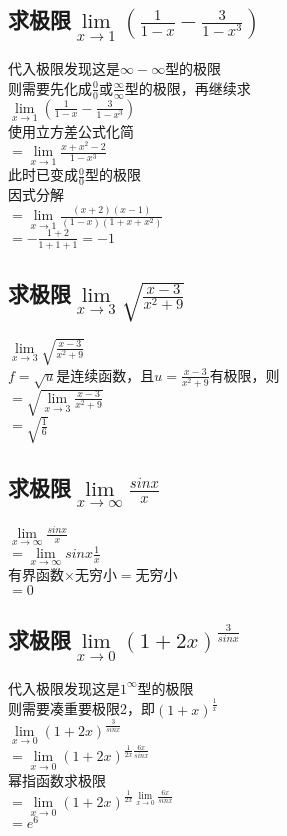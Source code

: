 \documentclass{article}
\begin{document}
\begin{flushleft}
	\subsection{
		求极限$\lim\limits_{x\to 1}(\frac{1}{1-x}-\frac{3}{1-x^3})$
	}
	代入极限发现这是$\infty-\infty$型的极限\\
	则需要先化成$\frac{0}{0}$或$\frac{\infty}{\infty}$型的极限，再继续求\\
	$\lim\limits_{x\to 1}(\frac{1}{1-x}-\frac{3}{1-x^3})$\\
	使用立方差公式化简\\
	$=\lim\limits_{x\to 1}\frac{x+x^2-2}{1-x^3}$\\
	此时已变成$\frac{0}{0}$型的极限\\
	因式分解\\
	$=\lim\limits_{x\to 1}\frac{(x+2)(x-1)}{(1-x)(1+x+x^2)}$\\
	$=-\frac{1+2}{1+1+1}=-1$\\
	
	\subsection{
		求极限$\lim\limits_{x\to 3}\sqrt{\frac{x-3}{x^2+9}}$
	}
	$\lim\limits_{x\to 3}\sqrt{\frac{x-3}{x^2+9}}$\\
	$f=\sqrt{u}$是连续函数，且$u=\frac{x-3}{x^2+9}$有极限，则\\
	$=\sqrt{\lim\limits_{x\to 3}\frac{x-3}{x^2+9}}$\\
	$=\sqrt{\frac{1}{6}}$\\
	
	\subsection{
		求极限$\lim\limits_{x\to \infty}\frac{sinx}{x}$
	}
	$\lim\limits_{x\to \infty}\frac{sinx}{x}$\\
	$=\lim\limits_{x\to \infty}sinx\frac{1}{x}$\\
	有界函数$\times$无穷小$=$无穷小\\
	$=0$\\
	
	\subsection{
	求极限$\lim\limits_{x\to 0}(1+2x)^{\frac{3}{sinx}}$
	}
	代入极限发现这是$1^\infty$型的极限\\
	则需要凑重要极限2，即$(1+x)^{\frac{1}{x}}$\\
	$\lim\limits_{x\to 0}(1+2x)^{\frac{3}{sinx}}$\\
	$=\lim\limits_{x\to 0}(1+2x)^{\frac{1}{2x}\frac{6x}{sinx}}$\\
	幂指函数求极限\\
	$=\lim\limits_{x\to 0}(1+2x)^{\frac{1}{2x}\lim\limits_{x\to 0}\frac{6x}{sinx}}$\\
	$=e^6$\\
	

\end{flushleft}
\end{document}
